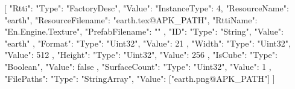 [{
        "Rtti": {
            "Type": "FactoryDesc",
            "Value": {
                "InstanceType": 4,
                "ResourceName": "earth",
                "ResourceFilename": "earth.tex@APK_PATH",
                "RttiName": "En.Engine.Texture",
                "PrefabFilename": ""
            }
        },
        "ID": {
            "Type": "String",
            "Value": "earth"
        },
        "Format": {
            "Type": "Uint32",
            "Value": 21
        },
        "Width": {
            "Type": "Uint32",
            "Value": 512
        },
        "Height": {
            "Type": "Uint32",
            "Value": 256
        },
        "IsCube": {
            "Type": "Boolean",
            "Value": false
        },
        "SurfaceCount": {
            "Type": "Uint32",
            "Value": 1
        },
        "FilePaths": {
            "Type": "StringArray",
            "Value": ["earth.png@APK_PATH"]
        }
    }]